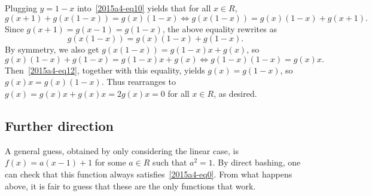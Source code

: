 Plugging $y = 1 - x$ into~\eqref{2015a4-eq10} yields that for all $x \in R$,
\[ g(x + 1) + g(x(1 - x)) = g(x) (1 - x) \iff g(x(1 - x)) = g(x) (1 - x) + g(x + 1). \]
Since $g(x + 1) = g(x - 1) = g(1 - x)$, the above equality rewrites as
\[ g(x(1 - x)) = g(x) (1 - x) + g(1 - x). \]
By symmetry, we also get $g(x(1 - x)) = g(1 - x) x + g(x)$, so
\[ g(x) (1 - x) + g(1 - x) = g(1 - x) x + g(x) \iff g(1 - x) (1 - x) = g(x) x. \]
Then~\eqref{2015a4-eq12}, together with this equality, yields $g(x) = g(1 - x)$, so $g(x) x = g(x)(1 - x)$.
Thus rearranges to $g(x) = g(x) x + g(x) x = 2 g(x) x = 0$ for all $x \in R$, as desired.



\subsection*{Further direction}

A general guess, obtained by only considering the linear case, is $f(x) = a(x - 1) + 1$ for some $a \in R$ such that $a^2 = 1$.
By direct bashing, one can check that this function always satisfies~\eqref{2015a4-eq0}.
From what happens above, it is fair to guess that these are the only functions that work.
